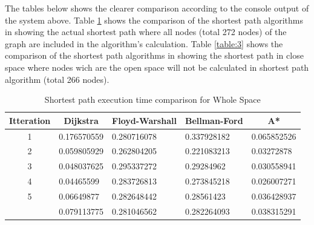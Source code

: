 The tables below shows the clearer comparison according to the console output of the system above. Table \ref{table:2} shows the comparison of the shortest path algorithms in showing the actual shortest path where all nodes (total 272 nodes) of the graph are included in the algorithm's calculation. Table \ref{table:3} shows the comparison of the shortest path algorithms in showing the shortest path in close space where nodes wich are the open space will not be calculated in shortest path algorithm (total 266 nodes).


\begin{table}[h!]
	\centering
	\caption{Shortest path execution time comparison for Whole Space}
	\label{table:2}
	\begin{tabular}{|c|l|l|l|l|}
		\hline
		\textbf{Itteration}                                            & \multicolumn{1}{c|}{\textbf{Dijkstra}} & \multicolumn{1}{c|}{\textbf{Floyd-Warshall}} & \multicolumn{1}{c|}{\textbf{Bellman-Ford}} & \multicolumn{1}{c|}{\textbf{A*}} \\ \hline
		1                                                              & 0.176570559                            & 0.280716078                                  & 0.337928182                                & 0.065852526                      \\ \hline
		2                                                              & 0.059805929                            & 0.262804205                                  & 0.221083213                                & 0.03272878                       \\ \hline
		3                                                              & 0.048037625                            & 0.295337272                                  & 0.29284962                                 & 0.030558941                      \\ \hline
		4                                                              & 0.04465599                             & 0.283726813                                  & 0.273845218                                & 0.026007271                      \\ \hline
		5                                                              & 0.06649877                             & 0.282648442                                  & 0.28561423                                 & 0.036428937                      \\ \hline
		\rowcolor[HTML]{9B9B9B} 
		\multicolumn{1}{|l|}{\cellcolor[HTML]{9B9B9B}\textbf{AVERAGE}} & 0.079113775                            & 0.281046562                                  & 0.282264093                                & 0.038315291                      \\ \hline
	\end{tabular}
\end{table}

